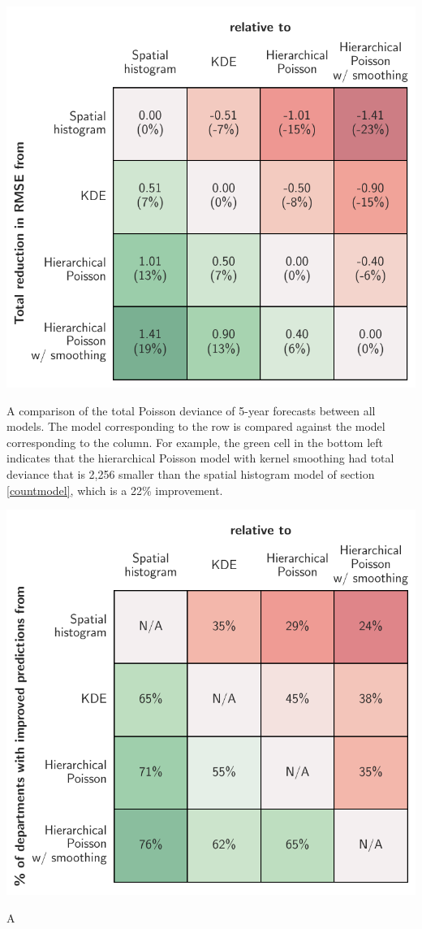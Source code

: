 \documentclass{svjour3}
\begin{document}
    \begin{table}[htb] \centering
    \includegraphics[width=.75\textwidth]{figures/dev_table.pdf}
    \caption{A comparison of the total Poisson deviance of 5-year forecasts between all models. The model corresponding to the row is compared against the model corresponding to the column. For example, the green cell in the bottom left indicates that the hierarchical Poisson model with kernel smoothing had total deviance that is 2,256 smaller than the spatial histogram model of section \protect\ref{countmodel}, which is a 22\% improvement.}
    \label{table:dev_table}
    \end{table}
  
    \begin{table}[htb] \centering
    \includegraphics[width=.75\textwidth]{figures/department_comparison.pdf}
    \caption{A}
    \label{table:dep_comparison}
    \end{table}
    
\end{document}

